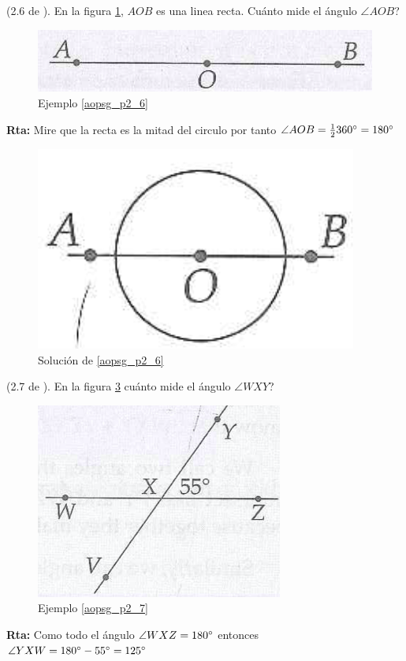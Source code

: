 \begin{ejemplo}
	\label{aopsg_p2_6}
	(2.6 de \cite{Aops_Geometria}). En la figura \ref{aopsgeo_p2_6}, $AOB$ es una linea recta. Cuánto mide el ángulo $\angle AOB$?
	
	\begin{figure}[H]
		\centering
		\includegraphics[width=0.7\linewidth]{Geometria/imgs/aopsgeo_p2_6}
		\caption{Ejemplo \ref{aopsg_p2_6}}
		\label{aopsgeo_p2_6}
	\end{figure}
	\textbf{Rta:} Mire que la recta es la mitad del circulo por tanto $\angle AOB=\frac{1}{2}360\degree =180\degree$
	\begin{figure}[H]
		\centering
		\includegraphics[width=0.3\linewidth]{Geometria/imgs/sol_aopsgeo_2_6}
		\caption{Solución de \ref{aopsg_p2_6}}
		\label{sol_aopsgeo_2_6}
	\end{figure}
\end{ejemplo}

\begin{ejemplo}
	\label{aopsg_p2_7}
	(2.7 de \cite{Aops_Geometria}). En la figura \ref{aopsgeo_p2_7} cuánto mide el ángulo $\angle WXY$?
	
	\begin{figure}[H]
		\centering
		\includegraphics[width=0.6\linewidth]{Geometria/imgs/aopsgeo_p2_7}
		\caption{Ejemplo \ref{aopsg_p2_7}}
		\label{aopsgeo_p2_7}
	\end{figure}
	\textbf{Rta:} Como todo el ángulo $\angle WXZ = 180\degree $ entonces $\angle YXW = 180\degree - 55\degree = 125\degree $
	
\end{ejemplo}

